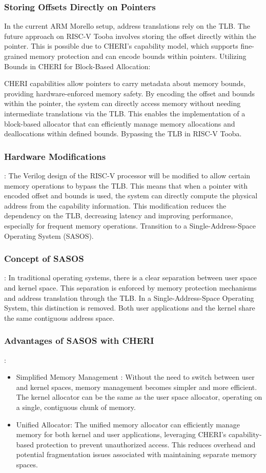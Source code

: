 \documentclass[acmsmall,screen,review]{acmart}
\begin{document}
\subsubsection{Storing Offsets Directly on Pointers}
In the current ARM Morello setup, address translations rely on the TLB.
The future approach on RISC-V Tooba involves storing the offset directly within the pointer. This is possible due to CHERI's capability model, which supports fine-grained memory protection and can encode bounds within pointers.
Utilizing Bounds in CHERI for Block-Based Allocation:

CHERI capabilities allow pointers to carry metadata about memory bounds, providing hardware-enforced memory safety.
By encoding the offset and bounds within the pointer, the system can directly access memory without needing intermediate translations via the TLB.
This enables the implementation of a block-based allocator that can efficiently manage memory allocations and deallocations within defined bounds.
Bypassing the TLB in RISC-V Tooba.
\subsubsection{Hardware Modifications}:
The Verilog design of the RISC-V processor will be modified to allow certain memory operations to bypass the TLB. This means that when a pointer with encoded offset and bounds is used, the system can directly compute the physical address from the capability information.
This modification reduces the dependency on the TLB, decreasing latency and improving performance, especially for frequent memory operations.
Transition to a Single-Address-Space Operating System (SASOS).
\subsubsection{Concept of SASOS}:
In traditional operating systems, there is a clear separation between user space and kernel space. This separation is enforced by memory protection mechanisms and address translation through the TLB.
In a Single-Address-Space Operating System, this distinction is removed. Both user applications and the kernel share the same contiguous address space.
\subsubsection{Advantages of SASOS with CHERI}:
\begin{itemize}
  \item Simplified Memory Management : Without the need to switch between user and kernel spaces, memory management becomes simpler and more efficient.
The kernel allocator can be the same as the user space allocator, operating on a single, contiguous chunk of memory.
  \item Unified Allocator: The unified memory allocator can efficiently manage memory for both kernel and user applications, leveraging CHERI's capability-based protection to prevent unauthorized access.
This reduces overhead and potential fragmentation issues associated with maintaining separate memory spaces.
\end{itemize}
\end{document}
